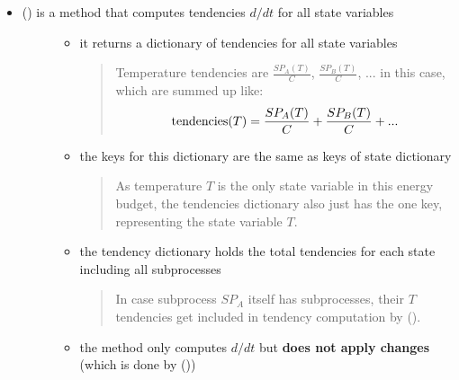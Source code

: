 \documentclass[a4paper,10pt,english]{sphinxmanual}
\begin{document}
\begin{itemize}
\item {} \begin{description}
\item[{{\hyperref[api/climlab.process:climlab.process.time_dependent_process.TimeDependentProcess.compute]{\emph{}}} () is a method that computes tendencies \(d/dt\) for all state variables}] \leavevmode\begin{itemize}
\item {} 
it returns a dictionary of tendencies for all state variables
\begin{quote}

Temperature tendencies are \(\frac{SP_A(T)}{C}\), \(\frac{SP_B(T)}{C}\), ... in this case, which are summed up like:
\begin{gather}
\begin{split}\textrm{tendencies}(T) = \frac{SP_A(T)}{C} + \frac{SP_B(T)}{C} + ...\end{split}\notag
\end{gather}\end{quote}

\item {} 
the keys for this dictionary are the same as keys of state dictionary
\begin{quote}

As temperature \(T\) is the only state variable in this energy budget, the tendencies dictionary also just has the one key, representing the state variable \(T\).
\end{quote}

\item {} 
the tendency dictionary holds the total tendencies for each state including all subprocesses
\begin{quote}

In case subprocess \(SP_A\) itself has subprocesses, their \(T\) tendencies get included in tendency computation by {\hyperref[api/climlab.process:climlab.process.time_dependent_process.TimeDependentProcess.compute]{\emph{}}} ().
\end{quote}

\item {} 
the method only computes \(d/dt\) but \textbf{does not apply changes} (which is done by {\hyperref[api/climlab.process:climlab.process.time_dependent_process.TimeDependentProcess.step_forward]{\emph{}}} ())


\end{itemize}
\end{description}
\end{itemize}
\end{document}
